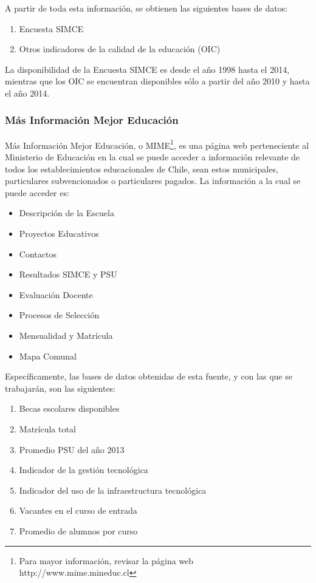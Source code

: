 A partir de toda esta información, se obtienen las siguientes bases de datos:
\begin{enumerate}
\item Encuesta SIMCE
\item Otros indicadores de la calidad de la educación (OIC)
\end{enumerate}

La disponibilidad de la Encuesta SIMCE es desde el año 1998 hasta el 2014, mientras que los OIC se encuentran disponibles sólo a partir del año 2010 y hasta el año 2014. 

\subsubsection{Más Información Mejor Educación}
Más Información Mejor Educación, o MIME\footnote{Para mayor información, revisar la página web http://www.mime.mineduc.cl}, es una página web perteneciente al Ministerio de Educación en la cual se puede acceder a información relevante de todos los establecimientos educacionales de Chile, sean estos municipales, particulares subvencionados o particulares pagados. 
La información a la cual se puede acceder es:
\begin{itemize}
\item Descripción de la Escuela
\item Proyectos Educativos
\item Contactos
\item Resultados SIMCE y PSU
\item Evaluación Docente
\item Procesos de Selección
\item Mensualidad y Matrícula
\item Mapa Comunal
\end{itemize}

Específicamente, las bases de datos obtenidas de esta fuente, y con las que se trabajarán, son las siguientes: 
\begin{enumerate}
\item Becas escolares disponibles
\item Matrícula total
\item Promedio PSU del año 2013
\item Indicador de la gestión tecnológica
\item Indicador del uso de la infraestructura tecnológica
\item Vacantes en el curso de entrada
\item Promedio de alumnos por curso
\end{enumerate}


